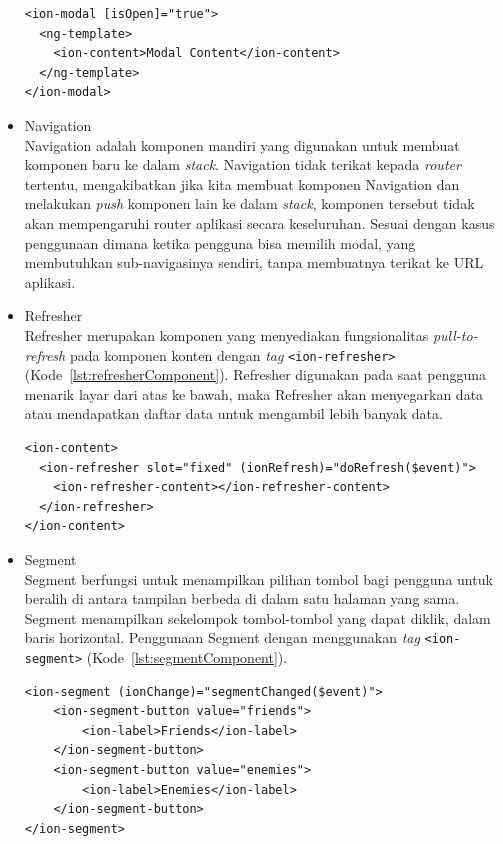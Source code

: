 \begin{itemize}
\begin{lstlisting}[label={lst:modalComponent}, caption=Kode Program dari Modal]
<ion-modal [isOpen]="true">
  <ng-template>
    <ion-content>Modal Content</ion-content>
  </ng-template>
</ion-modal>
\end{lstlisting} 

\newpage

	\item Navigation \\
	Navigation adalah komponen mandiri yang digunakan untuk membuat komponen baru ke dalam {\it stack}. Navigation tidak terikat kepada {\it router} tertentu, mengakibatkan jika kita membuat komponen Navigation dan melakukan {\it push} komponen lain ke dalam {\it stack}, komponen tersebut tidak akan mempengaruhi router aplikasi secara keseluruhan. Sesuai dengan kasus penggunaan dimana ketika pengguna bisa memilih modal, yang membutuhkan sub-navigasinya sendiri, tanpa membuatnya terikat ke URL aplikasi. 
	
	\item Refresher \\
	Refresher merupakan komponen yang menyediakan fungsionalitas \textit{pull-to-refresh} pada komponen konten dengan \textit{tag} \texttt{<ion-refresher>} (Kode~\ref{lst:refresherComponent}). Refresher digunakan pada saat pengguna menarik layar dari atas ke bawah, maka Refresher akan menyegarkan data atau mendapatkan daftar data untuk mengambil lebih banyak data. 
	
\begin{lstlisting}[label={lst:refresherComponent}, caption=Kode Program dari Refresher]
<ion-content>
  <ion-refresher slot="fixed" (ionRefresh)="doRefresh($event)">
    <ion-refresher-content></ion-refresher-content>
  </ion-refresher>
</ion-content>
\end{lstlisting}
	\item Segment \\
	Segment berfungsi untuk menampilkan pilihan tombol bagi pengguna untuk beralih di antara tampilan berbeda di dalam satu halaman yang sama. Segment menampilkan sekelompok tombol-tombol yang dapat diklik, dalam baris horizontal. Penggunaan Segment dengan menggunakan {\it tag} \texttt{<ion-segment>} (Kode~\ref{lst:segmentComponent}).
	
\begin{lstlisting}[label={lst:segmentComponent}, caption=Kode Program dari Segment]
<ion-segment (ionChange)="segmentChanged($event)">
	<ion-segment-button value="friends">
		<ion-label>Friends</ion-label>
	</ion-segment-button>
	<ion-segment-button value="enemies">
		<ion-label>Enemies</ion-label>
	</ion-segment-button>
</ion-segment>
\end{lstlisting}
	

\end{itemize}
